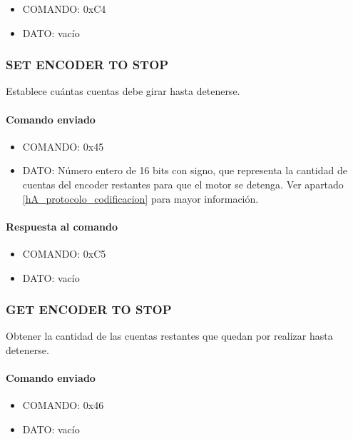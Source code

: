 \begin{itemize}
	\item{COMANDO:} 0xC4
	\item{DATO:} vac\'io
\end{itemize}

\subsubsection{SET ENCODER TO STOP}
\label{hA_protocolo_set_encoder_to_stop}

Establece cu\'antas cuentas debe girar hasta detenerse.

\paragraph*{Comando enviado}

\begin{itemize}
	\item{COMANDO:} 0x45
	\item{DATO:} N\'umero entero de 16 bits con signo, que representa la cantidad de cuentas del encoder restantes para que el motor se detenga.
		Ver apartado \ref{hA_protocolo_codificacion} para mayor informaci\'on.
\end{itemize}

\paragraph*{Respuesta al comando}

\begin{itemize}
	\item{COMANDO:} 0xC5
	\item{DATO:} vac\'io
\end{itemize}

\subsubsection{GET ENCODER TO STOP}
\label{hA_protocolo_get_encoder_to_stop}

Obtener la cantidad de las cuentas restantes que quedan por realizar hasta detenerse.

\paragraph*{Comando enviado}

\begin{itemize}
	\item{COMANDO:} 0x46
	\item{DATO:} vac\'io
\end{itemize}

